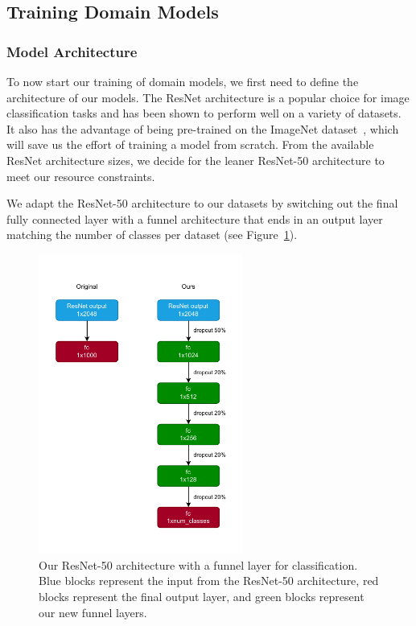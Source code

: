 \subsection{Training Domain Models}

\subsubsection{Model Architecture}

To now start our training of domain models,
we first need to define the architecture of our models.
The ResNet architecture\cite{he_deep_2015,he_identity_2016} is a popular choice for image classification tasks
and has been shown to perform well on a variety of datasets.
It also has the advantage of being pre-trained on the ImageNet dataset~\cite{deng_imagenet_2009,russakovsky_imagenet_2015},
which will save us the effort of training a model from scratch.
From the available ResNet architecture sizes,
we decide for the leaner ResNet-50 architecture to meet our resource constraints.

We adapt the ResNet-50 architecture to our datasets by switching out
the final fully connected layer with a funnel architecture that ends
in an output layer matching the number of classes per dataset (see Figure~\ref{fig:resnet_funnel}).

\begin{figure}[ht]
      \centering
      \includegraphics[width=0.6\textwidth]{figures/resnet_funnel.pdf}
      \caption{Our ResNet-50 architecture with a funnel layer for classification.
            Blue blocks represent the input from the ResNet-50 architecture,
            red blocks represent the final output layer,
            and green blocks represent our new funnel layers.}
      \label{fig:resnet_funnel}
\end{figure}

